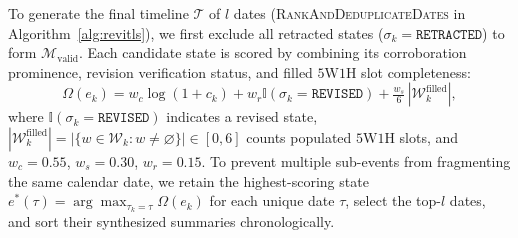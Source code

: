 \documentclass[journal]{IEEEtran}
\begin{document}
To generate the final timeline $\mathcal{T}$ of $l$ dates (\textsc{RankAndDeduplicateDates} in Algorithm~\ref{alg:revitls}), we first exclude all retracted states ($\sigma_k = \texttt{RETRACTED}$) to form $\mathcal{M}_{\text{valid}}$. Each candidate state is scored by combining its corroboration prominence, revision verification status, and filled $5\text{W}1\text{H}$ slot completeness:
\begin{equation}
\Omega(e_k) = w_c \log(1 + c_k) + w_r \mathbb{I}(\sigma_k\!=\!\texttt{REVISED}) + \tfrac{w_s}{6}\,|\mathcal{W}_k^{\text{filled}}|,
\label{eq:salience_score}
\end{equation}
where $\mathbb{I}(\sigma_k\!=\!\texttt{REVISED})$ indicates a revised state, $|\mathcal{W}_k^{\text{filled}}| = |\{w \in \mathcal{W}_k : w \neq \varnothing\}| \in [0, 6]$ counts populated $5\text{W}1\text{H}$ slots, and $w_c = 0.55$, $w_s = 0.30$, $w_r = 0.15$. To prevent multiple sub-events from fragmenting the same calendar date, we retain the highest-scoring state $e^*(\tau) = \arg\max_{\tau_k = \tau} \Omega(e_k)$ for each unique date $\tau$, select the top-$l$ dates, and sort their synthesized summaries chronologically.

\begin{table}[t]
\centering
\caption{Summary of Full-Corpus Evaluation Streams ($17{,}679$ Span-Filtered Articles, No Sampling), Controlled Suites, and Legacy Study}
\label{tab:datasets}
\renewcommand{\arraystretch}{1.12}
\end{table}
\end{document}

